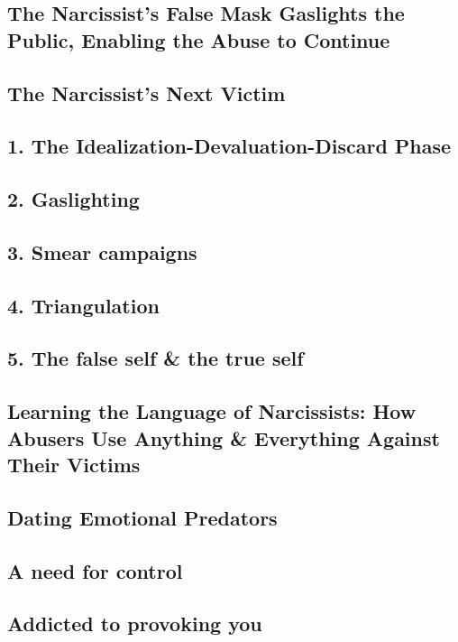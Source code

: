 \documentclass[oneside]{book}
\numberwithin{equation}{section}
\begin{document}
\subsection{The Narcissist's False Mask Gaslights the Public, Enabling the Abuse to Continue}

\subsection{The Narcissist's Next Victim}

\subsection{1. The Idealization-Devaluation-Discard Phase}

\subsection{2. Gaslighting}

\subsection{3. Smear campaigns}

\subsection{4. Triangulation}

\subsection{5. The false self \& the true self}

\subsection{Learning the Language of Narcissists: How Abusers Use Anything \& Everything Against Their Victims}

\subsection{Dating Emotional Predators}

\subsection{A need for control}

\subsection{Addicted to provoking you}
\end{document}

